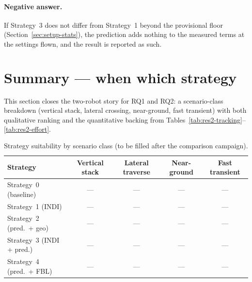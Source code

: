 \paragraph{Negative answer.} If Strategy~3 does not differ from Strategy~1 beyond the provisional
floor (Section~\ref{sec:setup-stats}), the prediction adds nothing to the measured terms at the
settings flown, and the result is reported as such.

\section{Summary --- when which strategy}
\label{sec:res2-summary}

This section closes the two-robot story for RQ1 and RQ2: a scenario-class breakdown (vertical stack,
lateral crossing, near-ground, fast transient) with both qualitative ranking and the quantitative
backing from Tables~\ref{tab:res2-tracking}--\ref{tab:res2-effort}.


\begin{table}[t]
  \centering
  \caption{Strategy suitability by scenario class (to be filled after the comparison campaign).}
  \label{tab:res2-when-which}
  \small
  \begin{tabular}{@{}lcccc@{}}
    \toprule
    Strategy & Vertical stack & Lateral traverse & Near-ground & Fast transient \\
    \midrule
    Strategy~0 (baseline) & --- & --- & --- & --- \\
    Strategy~1 (INDI) & --- & --- & --- & --- \\
    Strategy~2 (pred.\ + geo) & --- & --- & --- & --- \\
    Strategy~3 (INDI + pred.) & --- & --- & --- & --- \\
    Strategy~4 (pred.\ + FBL) & --- & --- & --- & --- \\
    \bottomrule
  \end{tabular}
\end{table}


